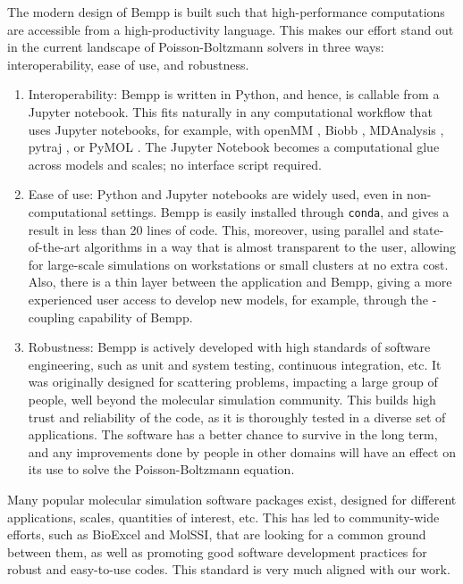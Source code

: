 The modern design of Bempp is built such that high-performance computations are accessible from a high-productivity language.
This makes our effort stand out in the current landscape of Poisson-Boltzmann solvers in three ways: interoperability, ease of use, and robustness. 
\begin{enumerate}
\item Interoperability: Bempp is written in Python, and hence, is callable from a Jupyter notebook. This fits naturally in any computational workflow that uses Jupyter notebooks, for example, with openMM \cite{EastmanETal2017}, Biobb \cite{AndrioETal2019}, MDAnalysis \cite{GowersETal2019}, pytraj \cite{RoeCheatham2013}, or PyMOL \cite{PyMOL}. The Jupyter Notebook becomes a computational glue across models and scales; no interface script required. 

\item Ease of use: Python and Jupyter notebooks are widely used, even in non-computational settings. Bempp is easily installed through \texttt{conda}, and gives a result in less than 20 lines of code. This, moreover, using parallel and state-of-the-art algorithms in a way that is almost transparent to the user, allowing for large-scale simulations on workstations or small clusters at no extra cost.
Also, there is a thin layer between the application and Bempp, giving a more experienced user access to develop new models, for example, through the \fmm-\bem coupling capability of Bempp.

\item Robustness: Bempp is actively developed with high standards of software engineering, such as unit and system testing, continuous integration, etc. It was originally designed for scattering problems, impacting a large group of people, well beyond the molecular simulation community. This builds high trust and reliability of the code, as it is thoroughly tested in a diverse set of applications. The software has a better chance to survive in the long term, and any improvements done by people in other domains will have an effect on its use to solve the Poisson-Boltzmann equation. 

\end{enumerate}

Many popular molecular simulation software packages exist, designed for different applications, scales, quantities of interest, etc.
This has led to community-wide efforts, such as BioExcel and MolSSI, that are looking for a common ground between them, as well as promoting good software development practices for robust and easy-to-use codes.
This standard is very much aligned with our work.